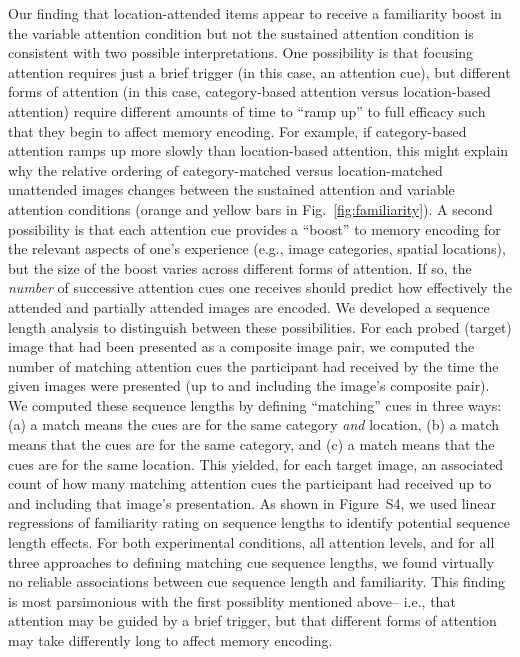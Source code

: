 \documentclass[english]{article}
\newcommand{\sequenceLength}{S4}
\begin{document}
Our finding that location-attended items appear to receive a familiarity boost
in the variable attention condition but not the sustained attention condition
is consistent with two possible interpretations. One possibility is that
focusing attention requires just a brief trigger (in this case, an attention
cue), but different forms of attention (in this case, category-based attention
versus location-based attention) require different amounts of time to ``ramp
up'' to full efficacy such that they begin to affect memory encoding. For
example, if category-based attention ramps up more slowly than location-based
attention, this might explain why the relative ordering of category-matched
versus location-matched unattended images changes between the sustained
attention and variable attention conditions (orange and yellow bars in
Fig.~\ref{fig:familiarity}). A second possibility is that each attention cue
provides a ``boost'' to memory encoding for the relevant aspects of one's
experience (e.g., image categories, spatial locations), but the size of the
boost varies across different forms of attention. If so, the \textit{number} of
successive attention cues one receives should predict how effectively the
attended and partially attended images are encoded. We developed a sequence
length analysis to distinguish between these possibilities. For each probed
(target) image that had been presented as a composite image pair, we computed
the number of matching attention cues the participant had received by the time
the given images were presented (up to and including the image's composite
pair). We computed these sequence lengths by defining ``matching'' cues in
three ways: (a) a match means the cues are for the same category \textit{and}
location, (b) a match means that the cues are for the same category, and (c) a
match means that the cues are for the same location. This yielded, for each
target image, an associated count of how many matching attention cues the
participant had received up to and including that image's presentation. As
shown in Figure~\sequenceLength, we used linear regressions of familiarity
rating on sequence lengths to identify potential sequence length effects. For
both experimental conditions, all attention levels, and for all three
approaches to defining matching cue sequence lengths, we found virtually no
reliable associations between cue sequence length and familiarity. This finding
is most parsimonious with the first possiblity mentioned above-- i.e., that
attention may be guided by a brief trigger, but that different forms of
attention may take differently long to affect memory encoding.
\end{document}
